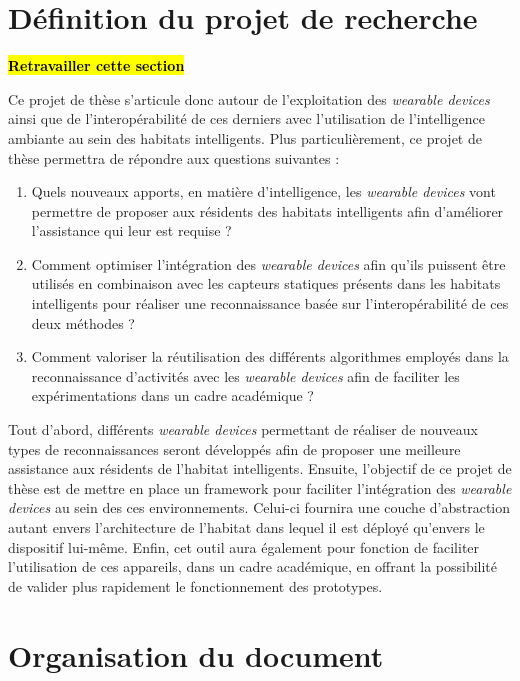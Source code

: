 {{\section{Définition du projet de recherche}
\label{sec:def_proj}

\textbf{\hl{Retravailler cette section}}

Ce projet de thèse s'articule donc autour de l'exploitation des \textit{wearable devices} ainsi que de l'interopérabilité de ces derniers avec l'utilisation de l'intelligence ambiante au sein des habitats intelligents. Plus particulièrement, ce projet de thèse permettra de répondre aux questions suivantes :

\begin{enumerate}
	\item
		\label{question:1}
		Quels nouveaux apports, en matière d'intelligence, les \textit{wearable devices} vont permettre de proposer aux résidents des habitats intelligents afin d'améliorer l'assistance qui leur est requise ?

	\item
		\label{question:2}
		Comment optimiser l'intégration des \textit{wearable devices} afin qu'ils puissent être utilisés en combinaison avec les capteurs statiques présents dans les habitats intelligents pour réaliser une reconnaissance basée sur l'interopérabilité de ces deux méthodes ?

	\item
		\label{question:3}
		Comment valoriser la réutilisation des différents algorithmes employés dans la reconnaissance d'activités avec les \textit{wearable devices} afin de faciliter les expérimentations dans un cadre académique ?
\end{enumerate}

Tout d'abord, différents \textit{wearable devices} permettant de réaliser de nouveaux types de reconnaissances seront développés afin de proposer une meilleure assistance aux résidents de l'habitat intelligents. Ensuite, l'objectif de ce projet de thèse est de mettre en place un framework pour faciliter l'intégration des \textit{wearable devices} au sein des ces environnements. Celui-ci fournira une couche d'abstraction autant envers l'architecture de l'habitat dans lequel il est déployé qu'envers le dispositif lui-même. Enfin, cet outil aura également pour fonction de faciliter l'utilisation de ces appareils, dans un cadre académique, en offrant la possibilité de valider plus rapidement le fonctionnement des prototypes.

\section{Organisation du document}

}}
